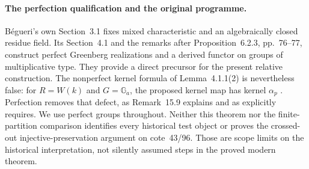 \paragraph{The perfection qualification and the original programme.}
Bégueri's own Section~3.1 fixes mixed characteristic and an
algebraically closed residue field. Its Section~4.1 and the remarks
after Proposition~6.2.3, pp.~76--77, construct perfect Greenberg
realizations and a derived functor on groups of multiplicative type.
They provide a direct precursor for the present relative construction.
The nonperfect kernel formula of Lemma~4.1.1(2) is nevertheless false:
for $R=W(k)$ and $G=\mathbb G_a$, the proposed kernel map has kernel
$\alpha_p$
\cite[Remark~14.22]{BBertapelleGonzalezAviles2022}.
Perfection removes that defect, as Remark~15.9 explains and as
\cite[footnote~13, p.~48]{BSuzuki2020} explicitly requires.
We use perfect groups throughout. Neither this theorem nor the
finite-partition comparison identifies every historical test object
or proves the crossed-out injective-preservation argument on
cote~43/96. Those are scope limits on the historical interpretation,
not silently assumed steps in the proved modern theorem.

